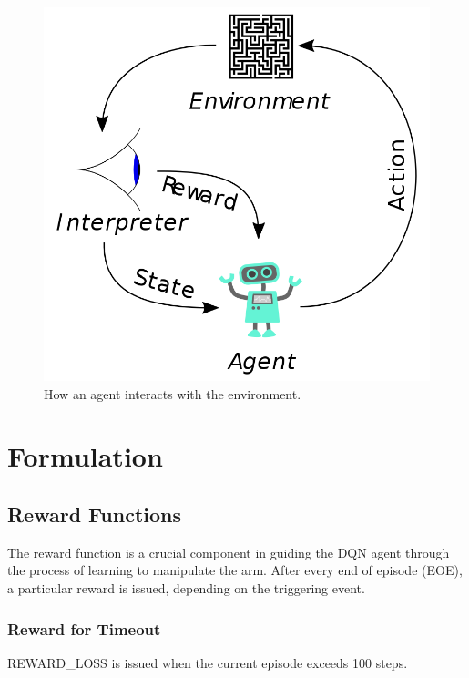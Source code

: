 \documentclass[10pt,journal,compsoc]{IEEEtran}
\begin{document}
\begin{figure}[thpb]
      \centering
      \includegraphics[width=\linewidth]{figs/Reinforcement_learning_diagram.png}
      \caption{How an agent interacts with the environment.}
      \label{fig:rl-interact}
\end{figure}

\section{Formulation}

\subsection{Reward Functions}

The reward function is a crucial component in guiding the DQN agent through the process of learning to manipulate the arm. After every end of episode (EOE), a particular reward is issued, depending on the triggering event.

\subsubsection{Reward for Timeout}

REWARD\_LOSS is issued when the current episode exceeds 100 steps.
\end{document}
